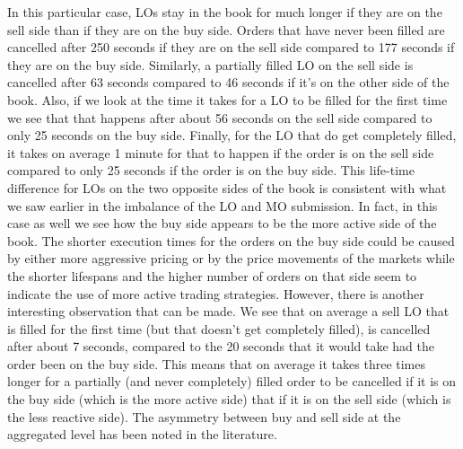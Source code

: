 In this particular case, LOs stay in the book for much longer if they are on the sell side than if they are on the buy side. Orders that have never been filled are cancelled after 250 seconds if they are on the sell side compared to 177 seconds if they are on the buy side. Similarly, a partially filled LO on the sell side is cancelled after 63 seconds compared to 46 seconds if it's on the other side of the book. Also, if we look at the time it takes for a LO to be filled for the first time we see that that happens after about 56 seconds on the sell side compared to only 25 seconds on the buy side. Finally, for the LO that do get completely filled, it takes on average 1 minute for that to happen if the order is on the sell side compared to only 25 seconds if the order is on the buy side. This life-time difference for LOs on the two opposite sides of the book is consistent with what we saw earlier in the imbalance of the LO and MO submission. In fact, in this case as well we see how the buy side appears to be the more active side of the book. The shorter execution times for the orders on the buy side could be caused by either more aggressive pricing or by the price movements of the markets while the shorter lifespans and the higher number of orders on that side seem to indicate the use of more active trading strategies. However, there is another interesting observation that can be made. We see that on average a sell LO that is filled for the first time (but that doesn't get completely filled), is cancelled after about 7 seconds, compared to the 20 seconds that it would take had the order been on the buy side. This means that on average it takes three times longer for a partially (and never completely) filled order to be cancelled if it is on the buy side (which is the more active side) that if it is on the sell side (which is the less reactive side). The asymmetry between buy and sell side at the aggregated level has been noted in the literature.


